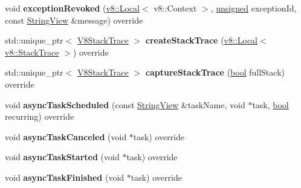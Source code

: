 \begin{DoxyCompactItemize}
\item 
\mbox{\label{classv8__inspector_1_1V8InspectorImpl_aab18c1b80251669f43fc6f985227ecc2}} 
void {\bfseries exception\+Revoked} (\mbox{\hyperlink{classv8_1_1Local}{v8\+::\+Local}}$<$ v8\+::\+Context $>$, \mbox{\hyperlink{classunsigned}{unsigned}} exception\+Id, const \mbox{\hyperlink{classv8__inspector_1_1StringView}{String\+View}} \&message) override
\item 
\mbox{\label{classv8__inspector_1_1V8InspectorImpl_a44cb685d7a98b5b11b761a3a79a1912c}} 
std\+::unique\+\_\+ptr$<$ \mbox{\hyperlink{classv8__inspector_1_1V8StackTrace}{V8\+Stack\+Trace}} $>$ {\bfseries create\+Stack\+Trace} (\mbox{\hyperlink{classv8_1_1Local}{v8\+::\+Local}}$<$ \mbox{\hyperlink{classv8_1_1StackTrace}{v8\+::\+Stack\+Trace}} $>$) override
\item 
\mbox{\label{classv8__inspector_1_1V8InspectorImpl_aada34a3dcd9d4b0e0c43158a69517c5c}} 
std\+::unique\+\_\+ptr$<$ \mbox{\hyperlink{classv8__inspector_1_1V8StackTrace}{V8\+Stack\+Trace}} $>$ {\bfseries capture\+Stack\+Trace} (\mbox{\hyperlink{classbool}{bool}} full\+Stack) override
\item 
\mbox{\label{classv8__inspector_1_1V8InspectorImpl_a2e860f46d7ee3a428044d2a84c42a443}} 
void {\bfseries async\+Task\+Scheduled} (const \mbox{\hyperlink{classv8__inspector_1_1StringView}{String\+View}} \&task\+Name, void $\ast$task, \mbox{\hyperlink{classbool}{bool}} recurring) override
\item 
\mbox{\label{classv8__inspector_1_1V8InspectorImpl_aed9e8a650c4dec36c43586100e40fdbb}} 
void {\bfseries async\+Task\+Canceled} (void $\ast$task) override
\item 
\mbox{\label{classv8__inspector_1_1V8InspectorImpl_a11221ce1a97d26f7c061d7bbcdf819a1}} 
void {\bfseries async\+Task\+Started} (void $\ast$task) override
\item 
\mbox{\label{classv8__inspector_1_1V8InspectorImpl_ac13a10459cb9c91ef4cb6e72d2acffd3}} 
void {\bfseries async\+Task\+Finished} (void $\ast$task) override

\end{DoxyCompactItemize}
